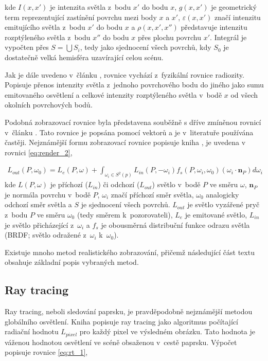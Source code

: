 kde $I(x, x')$ je intenzita světla z~bodu $x'$ do bodu $x$, $g(x, x')$ je geometrický term reprezentující zastínění povrchu mezi body $x$ a $x'$, $\varepsilon(x, x')$ značí intenzitu emitujícího světla z~bodu $x'$ do bodu $x$ a $\rho(x, x', x'')$ představuje intenzitu rozptýleného světla z~bodu $x''$ do bodu $x$ přes plochu povrchu $x'$. Integrál je vypočten přes $S = \bigcup S_i$, tedy jako sjednocení všech povrchů, kdy $S_0$ je dostatečně velká hemisféra uzavírající celou scénu.

Jak je dále uvedeno v~článku \cite{render_eq}, rovnice vychází z~fyzikální rovnice radiozity. Popisuje přenos intenzity světla z~jednoho povrchového bodu do jiného jako sumu emitovaného osvětlení a celkové intenzity rozptýleného světla v~bodě $x$ od všech okolních povrchových bodů.

Podobná zobrazovací rovnice byla představena souběžně s dříve zmíněnou rovnicí v~článku \cite{render_eq_2}. Tato rovnice je popsána pomocí vektorů a je v~literatuře používána častěji. Nejznámější formu zobrazovací rovnice popisuje kniha \cite{gfx_principles_practice}, je uvedena v rovnici \ref{eq:render_2},

\begin{equation} \label{eq:render_2}
	\begin{gathered}
		L_{out}(P, \omega_0) = L_e(P, \omega) + \int_{\omega_i\in S^2(p)}L_{in}(P, -\omega_i)f_s(P, \omega_i, \omega_0)(\omega_i \cdot \textbf{n}_P)d\omega_i
	\end{gathered}
\end{equation}
kde $L(P, \omega)$ je příchozí ($L_{in}$) či odchozí ($L_{out}$) světlo v~bodě $P$ ve směru $\omega$, $\textbf{n}_P$ je normála povrchu v~bodě $P$, $\omega_i$ značí příchozí směr světla, $\omega_0$ analogicky odchozí směr světla a $S$ je sjednocení všech povrchů. $L_{out}$ je světlo vyzářené pryč z~bodu $P$ ve směru $\omega_0$ (tedy směrem k~pozorovateli), $L_e$ je emitované světlo, $L_{in}$ je světlo přicházející z~$\omega_i$ a $f_s$ je obousměrná distribuční funkce odrazu světla (BRDF; světlo odražené z~$\omega_i$ k~$\omega_0$).

Existuje mnoho metod realistického zobrazování, přičemž následující část textu obsahuje základní popis vybraných metod.

\subsection{Ray tracing}\label{sec:ray_tracing}
Ray tracing, neboli sledování paprsku, je pravděpodobně nejznámější metodou globálního osvětlení. Kniha \cite{advanced_global} popisuje ray tracing jako algoritmus počítající radiační hodnotu $L_{pixel}$ pro každý pixel ve výsledném obrázku. Tato hodnota je váženou hodnotou osvětlení ve scéně obsaženou v~cestě paprsku. Výpočet popisuje rovnice \ref{eq:rt_1},

